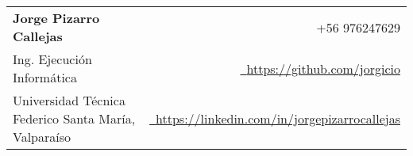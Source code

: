 \documentclass[a4paper,11pt]{article}
\makeatletter
\newcommand{\name}{Jorge Pizarro Callejas} %
\newcommand{\roll}{xxxxxxx} %
\newcommand{\phone}{976247629} %
\newcommand{\emaila}{jpizarrocallejas@gmail.com} %
\makeatother
\begin{document}
\selectfont

{
\begin{tabularx}{\linewidth}{L r} \\
  \textbf{\Large \name} & {\raisebox{0.0\height}{\footnotesize \faPhone}\ +56 \phone}\\
  Ing. Ejecución Informática & \href{https://github.com/jorgicio}{\raisebox{0.0\height}{\footnotesize \faGithub}\ {https://github.com/jorgicio}} \\  
  {Universidad Técnica Federico Santa María, Valparaíso} & \href{https://www.linkedin.com/in/jorgepizarrocallejas/}{\raisebox{0.0\height}{\footnotesize \faLinkedin}\ {https://linkedin.com/in/jorgepizarrocallejas}}
\end{tabularx}
}


\end{document}
